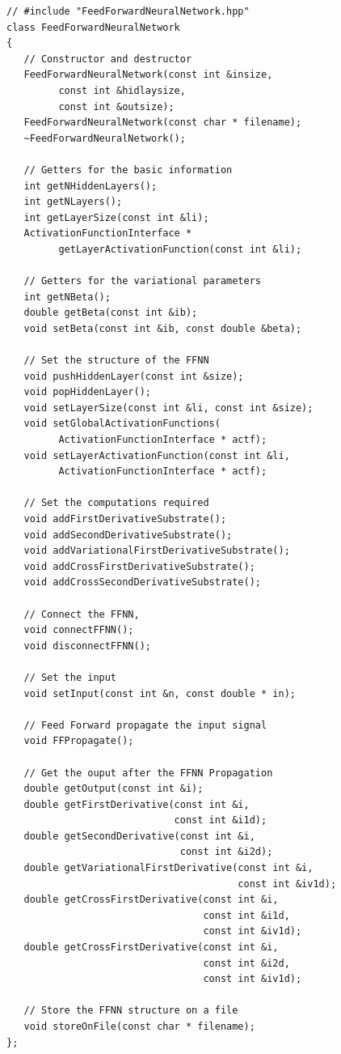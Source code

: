 \documentclass[11pt,a4paper,twoside]{article}
\begin{document}
\begin{verbatim}
// #include "FeedForwardNeuralNetwork.hpp"
class FeedForwardNeuralNetwork
{
   // Constructor and destructor
   FeedForwardNeuralNetwork(const int &insize,
         const int &hidlaysize,
         const int &outsize);
   FeedForwardNeuralNetwork(const char * filename);
   ~FeedForwardNeuralNetwork();

   // Getters for the basic information
   int getNHiddenLayers();
   int getNLayers();
   int getLayerSize(const int &li);
   ActivationFunctionInterface *
         getLayerActivationFunction(const int &li);

   // Getters for the variational parameters
   int getNBeta();
   double getBeta(const int &ib);
   void setBeta(const int &ib, const double &beta);

   // Set the structure of the FFNN
   void pushHiddenLayer(const int &size);
   void popHiddenLayer();
   void setLayerSize(const int &li, const int &size);
   void setGlobalActivationFunctions(
         ActivationFunctionInterface * actf);
   void setLayerActivationFunction(const int &li,
         ActivationFunctionInterface * actf);

   // Set the computations required
   void addFirstDerivativeSubstrate();
   void addSecondDerivativeSubstrate();
   void addVariationalFirstDerivativeSubstrate();
   void addCrossFirstDerivativeSubstrate();
   void addCrossSecondDerivativeSubstrate();

   // Connect the FFNN,
   void connectFFNN();
   void disconnectFFNN();

   // Set the input
   void setInput(const int &n, const double * in);

   // Feed Forward propagate the input signal
   void FFPropagate();

   // Get the ouput after the FFNN Propagation
   double getOutput(const int &i);
   double getFirstDerivative(const int &i,
                             const int &i1d);
   double getSecondDerivative(const int &i,
                              const int &i2d);
   double getVariationalFirstDerivative(const int &i,
                                        const int &iv1d);
   double getCrossFirstDerivative(const int &i,
                                  const int &i1d,
                                  const int &iv1d);
   double getCrossFirstDerivative(const int &i,
                                  const int &i2d,
                                  const int &iv1d);

   // Store the FFNN structure on a file
   void storeOnFile(const char * filename);
};
\end{verbatim}
\end{document}
